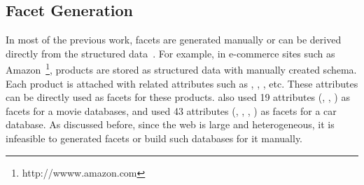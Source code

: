 \subsection{Facet Generation}
In most of the previous work, facets are generated manually or can be derived directly from the structured data~\cite{basu2008minimum,yee2003faceted,dash2008dynamic,ben2008beyond}. For example, in e-commerce sites such as Amazon~\footnote{http://wwww.amazon.com}, products are stored as structured data with manually created schema. Each product is attached with related attributes such as , , , etc. These attributes can be directly used as facets for these products. \citet{basu2008minimum} also used 19 attributes (\eg, , ) as facets for a movie databases, and used 43 attributes (\eg, , , ) as facets for a car database. As discussed before, since the web is large and heterogeneous, it is infeasible to generated facets or build such databases for it manually.

